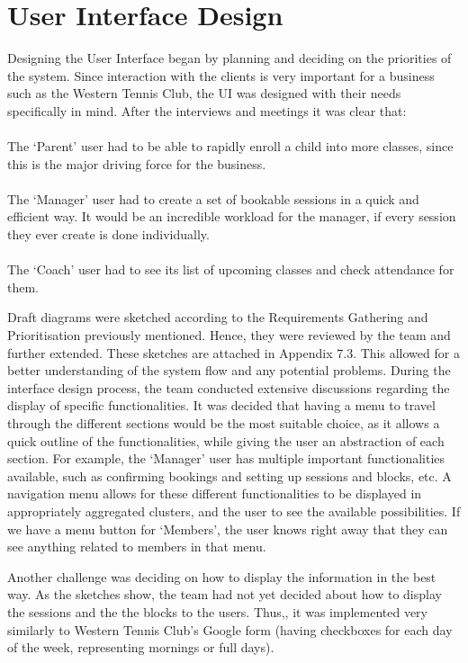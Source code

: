 \documentclass{l3proj}
\begin{document}
\section{User Interface Design}
\par
Designing the User Interface began by planning and deciding on the priorities of the system. Since interaction with the clients is very important for a business such as the Western Tennis Club, the UI was designed with their needs specifically in mind. After the interviews and meetings it was clear that:\\
\\The `Parent' user had to be able to rapidly enroll a child into more classes, since this is the major driving force for the business.\\
\\The `Manager' user had to create a set of bookable sessions in a quick and efficient way. It would be an incredible workload for the manager, if every session they ever create is done individually.\\
\\The `Coach' user had to see its list of upcoming classes and check attendance for them.\\
\par Draft diagrams were sketched according to the Requirements Gathering and Prioritisation previously mentioned. Hence, they were reviewed by the team and further extended. These sketches are attached in Appendix 7.3. This allowed for a better understanding of the system flow and any potential problems. During the interface design process, the team conducted extensive discussions regarding the display of specific functionalities.  It was decided that having a menu to travel through the different sections would be the most suitable choice, as it allows a quick outline of the functionalities, while giving the user an abstraction of each section. For example, the `Manager' user has multiple important functionalities available, such as confirming bookings and setting up sessions and blocks, etc. A navigation menu allows for these different functionalities to be displayed in appropriately aggregated clusters, and the user to see the available possibilities. If we have a menu button for `Members', the user knows right away that they can see anything related to members in that menu.\\
\par Another challenge was deciding on how to display the information in the best way. As the sketches show, the team had not yet decided about how to display the sessions and the the blocks to the users. Thus,, it was implemented very similarly to Western Tennis Club’s Google form (having checkboxes for each day of the week, representing mornings or full days). \\
\end{document}
